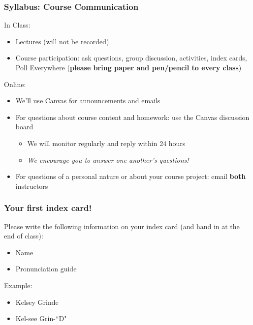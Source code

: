 \documentclass[12pt, 
hyperref={colorlinks=true, linkcolor=blue, urlcolor=cyan}]{beamer}
\begin{document}
\begin{frame}
\frametitle{Syllabus: Course Communication}

In Class: \vspace{-0.3cm}
\begin{itemize} 
\item Lectures (will not be recorded)
\item Course participation: ask questions, group discussion, activities, index cards, Poll Everywhere (\textbf{please bring paper and pen/pencil to every class})
\end{itemize}

Online: \vspace{-0.3cm}
\begin{itemize}
\item We'll use Canvas for announcements and emails
\item For questions about course content and homework: use the Canvas discussion board
	\begin{itemize}
	\item We will monitor regularly and reply within 24 hours
	\item \textit{We encourage you to answer one another's questions!}
	\end{itemize}
\item For questions of a personal nature or about your course project: email \textbf{both} instructors
\end{itemize}

\end{frame}

\begin{frame}
\frametitle{Your first index card!}

Please write the following information on your index card (and hand in at the end of class):
\begin{itemize}
\item Name
\item Pronunciation guide
\end{itemize}

Example:
\begin{itemize}
\item Kelsey Grinde
\item Kel-see Grin-``D"
\end{itemize}

\end{frame}
\end{document}

